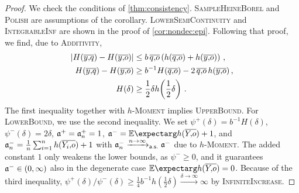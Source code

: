 \begin{proof}
	We check the conditions of \autoref{thm:consistency}. \textsc{SampleHeineBorel} and \textsc{Polish} are assumptions of the corollary. \textsc{LowerSemiContinuity} and \textsc{IntegrableInf} are shown in the proof of \autoref{cor:nondec:epi}.
	Following that proof, we find, due to \textsc{Additivity},
	\begin{align*}
		\abs{H(\ol yq) - H(\ol yo)} &\leq b\, \ol qo \br{h(\ol qo) + h(\ol yo)}\eqcm
		\\
		H(\ol yq) - H(\ol yo) &\geq 	b^{-1} H( \ol qo) - 2 \,\ol qo\, h( \ol yo)\eqcm\\
		H(\delta)  &\geq \frac12 \delta h\brOf{\frac12 \delta}
		\eqfs
	\end{align*}
	The first inequality together with \textsc{$h$-Moment} implies \textsc{UpperBound}.
	For \textsc{LowerBound}, we use the second inequality. We set $\psi^+(\delta) = 	b^{-1} H(\delta)$, $\psi^-(\delta) = 2 \delta$, $\mathfrak{a}^+=\mathfrak{a}_n^+ = 1$, $\mf a^{-} = \Ex{h(\ol Yo)} + 1$, and $\mathfrak{a}^-_n = \frac1n \sum_{i=1}^n h(\overline{Y_i,\!o}) + 1$ with $\mathfrak{a}^-_n\xrightarrow{n\to\infty}_{\mathsf{a.s.}}\mathfrak{a}^-$ due to \textsc{$h$-Moment}. The added constant $1$ only weakens the lower bounds, as $\psi^-\geq0$, and it guarantees $\mathfrak{a}^-\in(0,\infty)$ also in the degenerate case $\Ex{h(\ol Yo)} = 0$. Because of the third inequality, $\psi^+(\delta)/\psi^-(\delta) \geq \frac14 b^{-1} h(\frac12 \delta) \xrightarrow{\delta\to\infty} \infty$ by \textsc{InfiniteIncrease}.
\end{proof}
%
